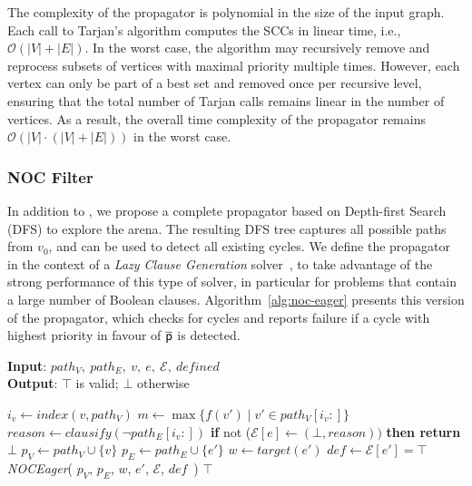 \documentclass{article}
\begin{document}
The complexity of the \nocchecker propagator is polynomial in the size of the input graph. Each call to Tarjan's algorithm computes the SCCs in linear time, i.e., $\mathcal{O}(|V| + |E|)$. In the worst case, the algorithm may recursively remove and reprocess subsets of vertices with maximal priority multiple times. However, each vertex can only be part of a best set and removed once per recursive level, ensuring that the total number of Tarjan calls remains linear in the number of vertices. As a result, the overall time complexity of the propagator remains $\mathcal{O}(|V| \cdot (|V| + |E|))$ in the worst case.

\subsubsection*{NOC Filter} \label{sec:nocfilter}
In addition to \nocchecker, we propose a complete propagator based on Depth-first Search (DFS) to explore the arena. The resulting DFS tree captures all possible paths from $v_0$, and can be used to detect all existing cycles. We define the propagator in the context of a \textit{Lazy Clause Generation} solver~\cite{DBLP:journals/constraints/OhrimenkoSC09}, to take advantage of the strong performance of this type of solver, in particular for problems that contain a large number of Boolean clauses. Algorithm~\ref{alg:noc-eager} presents this version of the propagator, which checks for cycles and reports failure if a cycle with highest priority in favour of $\opponent$ is detected.

\begin{algorithm}
\small
\caption{\textbf{\textit{NOCEager}}}
\textbf{Input}: $path_V,\ path_E,\ v,\ e,\ \mathcal{E},\ \textit{defined}$ \\
\textbf{Output}: $\top$ is valid; $\bot$ otherwise
\begin{algorithmic}[1]
     \label{alg:noc-eager:pathcheck}
        \STATE $i_v \gets \textit{index}(v, path_V)$
        \STATE $m \gets \max\{f(v') \mid v' \in path_V[i_v:]\}$
         \label{alg:noc-eager:checkopponent}
            \STATE $\textit{reason} \gets \textit{clausify}(\neg path_E[i_v:])$ \label{alg:noc-eager:reason}
            \STATE \textbf{if }not ($\mathcal{E}[e] \gets (\bot, \textit{reason}))$ \textbf{then return $\bot$}
        \ENDIF
     \label{alg:noc-eager:defcheck}
         \label{alg:no-opponent-cycle-f1:edgecheck}
            \STATE $p_V \gets path_V \cup \{v\}$
            \STATE $p_E \gets path_E \cup \{e'\}$
            \STATE $w \gets \textit{target}(e')$
            \STATE $\textit{def} \gets \mathcal{E}[e'] = \top$
            \STATE \textit{NOCEager}(
                $p_V$,
                $p_E$,
                $w$,
                $e'$,
                $\mathcal{E}$,
                $\textit{def}$\ )
        \ENDFOR
    \ENDIF
    \RETURN $\top$
\end{algorithmic}
\label{alg:noc-eager}
\end{algorithm}
\end{document}
